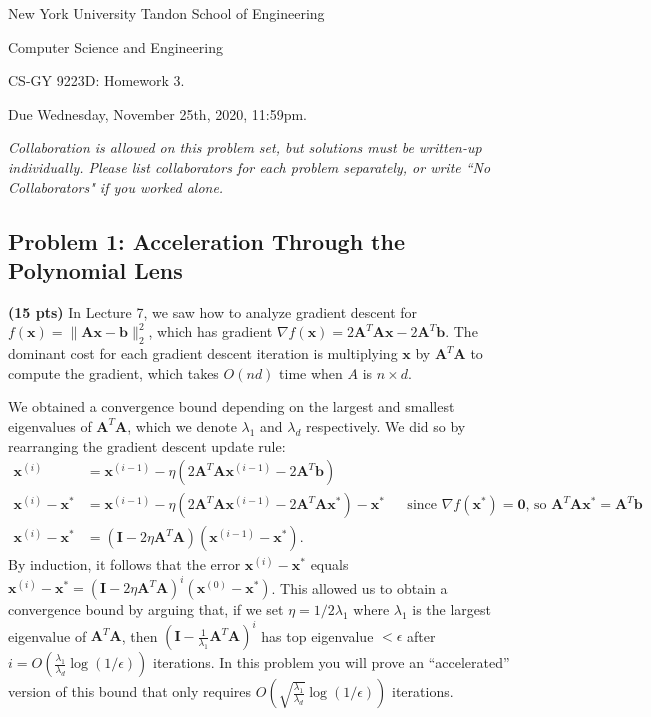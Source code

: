 \documentclass[10pt]{article}
\newcommand{\bv}[1]{\mathbf{#1}}
\begin{document}
	
\begin{center}
	\normalsize
	New York University Tandon School of Engineering
	
	Computer Science and Engineering
	\medskip
	
	\large
	CS-GY 9223D: Homework 3. 
	
	Due Wednesday, November 25th, 2020, 11:59pm.
	\medskip
	
	\normalsize 
	\noindent \emph{Collaboration is allowed on this problem set, but solutions must be written-up individually. Please list collaborators for each problem separately, or write ``No Collaborators" if you worked alone.}
	\medskip
\end{center} 


\subsection{Problem 1: Acceleration Through the Polynomial Lens}
\textbf{(15 pts)}
In Lecture 7, we saw how to analyze gradient descent for $f(\bv{x}) = \|\bv{A}\bv{x} - \bv{b}\|_2^2$, which has gradient $\nabla f(\bv{x}) = 2\bv{A}^T\bv{A}\bv{x} - 2\bv{A}^T\bv{b}$. The dominant cost for each gradient descent iteration is multiplying $\bv{x}$ by $\bv{A}^T\bv{A}$ to compute the gradient, which takes $O(nd)$ time when $A$ is $n\times d$. 

We obtained a convergence bound depending on the largest and smallest eigenvalues of $\bv{A}^T\bv{A}$, which we denote $\lambda_1$ and $\lambda_d$ respectively. We did so by rearranging the gradient descent update rule:
\begin{align*}
	\bv{x}^{(i)} &= \bv{x}^{(i-1)} - \eta\left(2\bv{A}^T\bv{A}\bv{x}^{(i-1)} - 2\bv{A}^T\bv{b}\right) \\
	\bv{x}^{(i)} - \bv{x}^* &= \bv{x}^{(i-1)} - \eta\left(2\bv{A}^T\bv{A}\bv{x}^{(i-1)} - 2\bv{A}^T\bv{A}\bv{x}^*\right) -\bv{x}^*&& \text{since $\nabla f(\bv{x}^*)=\bv{0}$, so $\bv{A}^T\bv{A}\bv{x}^* = \bv{A}^T\bv{b}$}\\
	\bv{x}^{(i)} - \bv{x}^* &= (\bv{I} - 2\eta\bv{A}^T\bv{A})(\bv{x}^{(i-1)} - \bv{x}^*).
\end{align*}
By induction, it follows that the error $\bv{x}^{(i)} - \bv{x}^*$ equals $\bv{x}^{(i)} - \bv{x}^* = (\bv{I} - 2\eta\bv{A}^T\bv{A})^i(\bv{x}^{(0)} - \bv{x}^*)$. This allowed us to obtain a convergence bound by arguing that, if we set $\eta = 1/2\lambda_1$ where $\lambda_1$ is the largest eigenvalue of $\bv{A}^T\bv{A}$, then $(\bv{I} - \frac{1}{\lambda_1}\bv{A}^T\bv{A})^i$ has top eigenvalue $< \epsilon$ after $i = O(\frac{\lambda_1}{\lambda_d}\log(1/\epsilon))$ iterations. In this problem you will prove an ``accelerated'' version of this bound that only requires $O(\sqrt{\frac{\lambda_1}{\lambda_d}} \log(1/\epsilon))$ iterations.  
\end{document}
